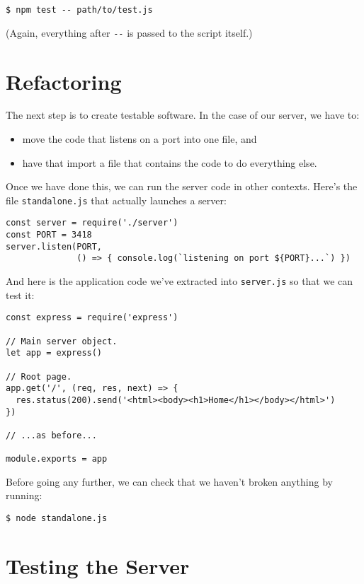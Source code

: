 \begin{verbatim}
$ npm test -- path/to/test.js
\end{verbatim}

(Again, everything after \texttt{-\/-} is passed to the script itself.)

\section{Refactoring}\label{s:testing-refactoring}

The next step is to create testable software.
In the case of our server,
we have to:

\begin{itemize}
\item
  move the code that listens on a port into one file, and
\item
  have that import a file that contains the code to do everything else.
\end{itemize}

Once we have done this,
we can run the server code in other contexts.
Here's the file \texttt{standalone.js} that actually launches a server:

\begin{verbatim}
const server = require('./server')
const PORT = 3418
server.listen(PORT,
              () => { console.log(`listening on port ${PORT}...`) })
\end{verbatim}

\noindent
And here is the application code we've extracted into \texttt{server.js}
so that we can test it:

\begin{verbatim}
const express = require('express')

// Main server object.
let app = express()

// Root page.
app.get('/', (req, res, next) => {
  res.status(200).send('<html><body><h1>Home</h1></body></html>')
})

// ...as before...

module.exports = app
\end{verbatim}

Before going any further,
we can check that we haven't broken anything by running:

\begin{verbatim}
$ node standalone.js
\end{verbatim}

\section{Testing the Server}\label{s:testing-server}

